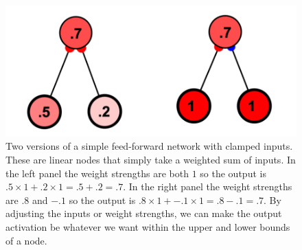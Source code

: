 \begin{figure}[h]
\centering
\includegraphics[scale=.25]{./images/2NodeSimpleFF.png}
\caption[Simbrain screenshot.]{Two versions of a simple feed-forward network with clamped inputs. These are linear nodes that simply take a weighted sum of inputs.  In the left panel the weight strengths are both $1$ so the output is$.5 \times 1 + .2 \times 1 = .5+.2 = .7$. In the right panel the weight strengths are $.8$ and $-.1$ so the output is $.8 \times 1 + -.1 \times 1 = .8 - .1 = .7$. By adjusting the inputs or weight strengths, we can make the output activation be whatever we want within the upper and lower bounds of a node. }
\label{2NodeSimpleFF}
\end{figure}

